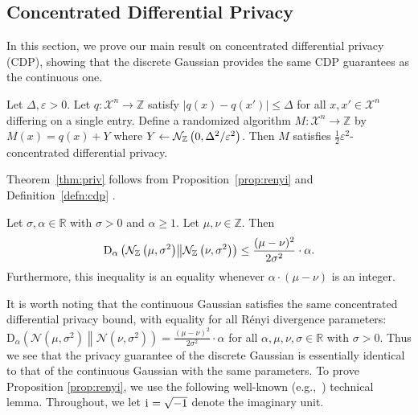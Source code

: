 \documentclass{jpcfinal} %
\newcommand{\ii}{\mathrm{i}\mkern1mu}
\newcommand{\dgausss}[2]{{\discN\left(#1,#2\right)}}
\newcommand{\dgauss}[1]{\dgausss{0}{#1}}
\newcommand{\dr}[3]{\mathrm{D}_{#1}\left(#2\middle\|#3\right)}
\newcommand{\eps}{\varepsilon}
\newcommand{\Z}{\mathbb{Z}}
\newcommand{\R}{\mathbb{R}}
\begin{document}
\subsection{Concentrated Differential Privacy}
In this section, we prove our main result on concentrated differential privacy (CDP), showing that the discrete Gaussian provides the same CDP guarantees as the continuous one.
\begin{thm}\label{thm:priv}
Let $\Delta,\eps>0$.
Let $q\colon \mathcal{X}^n \to \Z$ satisfy $|q(x)-q(x')|\le\Delta$ for all $x,x'\in\mathcal{X}^n$ differing on a single entry. Define a randomized algorithm $M\colon \mathcal{X}^n \to \Z$ by $M(x)=q(x)+Y$ where $Y \gets \dgauss{\Delta^2/\eps^2}$. Then $M$ satisfies $\frac12 \eps^2$-concentrated differential privacy.
\end{thm}
\noindent Theorem~\ref{thm:priv} follows from Proposition~\ref{prop:renyi} and Definition~\ref{defn:cdp} .
\begin{prop}\label{prop:renyi}
Let $\sigma,\alpha \in \R$ with $\sigma>0$ and $\alpha \ge 1$. Let $\mu, \nu \in \Z$. Then 
\begin{equation}
\dr{\alpha}{\dgausss{\mu}{\sigma^2}}{\dgausss{\nu}{\sigma^2}}\le \frac{(\mu-\nu)^2}{2\sigma^2}\cdot \alpha.
\end{equation}
Furthermore, this inequality is an equality whenever $\alpha \cdot (\mu - \nu)$ is an integer.
\end{prop}
It is worth noting that the continuous Gaussian satisfies the same concentrated differential privacy bound, with equality for all R\'enyi divergence parameters: $\dr{\alpha}{\mathcal{N}(\mu,\sigma^2)}{\mathcal{N}(\nu,\sigma^2)} = \frac{(\mu-\nu)^2}{2\sigma^2} \cdot \alpha$ for all $\alpha,\mu,\nu,\sigma \in \R$ with $\sigma>0$. Thus we see that the privacy guarantee of the discrete Gaussian is essentially identical to that of the continuous Gaussian with the same parameters. 
To prove Proposition \ref{prop:renyi}, we use the following well-known (e.g.,~\citep{Regev09}) technical lemma. Throughout, we let $\ii{}=\sqrt{-1}$ denote the imaginary unit. 
\end{document}
